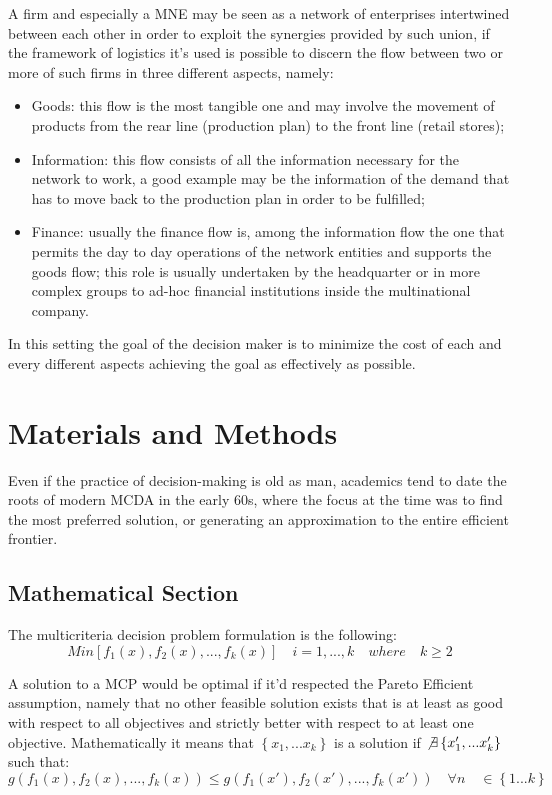 \documentclass[a0,portrait]{a0poster}
\begin{document}
\begin{multicols}{2}
A firm and especially a MNE may be seen as a network of enterprises intertwined between each other in order to exploit the synergies provided by such union, if the framework of logistics it's used is possible to discern the flow between two or more of such firms in three different aspects, namely:

\begin{itemize}
 \item Goods: this flow is the most tangible one and may involve the movement of products from the rear line (production plan) to the front line (retail stores);    
\item Information: this flow consists of all the information necessary for the network to work, a good example may be the information of the demand that has to move back to the production plan in order to be fulfilled;
\item Finance: usually the finance flow is, among the information flow the one that permits the day to day operations of the network entities and supports the goods flow; this role is usually undertaken by the headquarter or in more complex groups to ad-hoc financial institutions inside the multinational company. 
\end{itemize}
In this setting the goal of the decision maker is to minimize the cost of each and every different aspects achieving the goal as effectively as possible.

\section*{Materials and Methods}
Even if the practice of decision-making is old as man, academics tend to date the roots of modern MCDA in the early 60s, where the focus at the time was to find the most preferred solution, or generating an approximation to the entire efficient frontier\cite{Greco2016}.


\subsection*{Mathematical Section}

The multicriteria decision problem formulation is the following: 
$$
Min[f_1(x),f_2(x),...,f_k(x)] \quad i=1,...,k \quad where \quad k\geq2
$$
	

A solution to a MCP would be optimal if it'd respected the Pareto Efficient assumption, namely that no other feasible solution exists that is at least as good with respect to all objectives and strictly better with respect to at least one objective. Mathematically it means that $\left\{x_1,...x_k\right\}$ is a solution if $\not\exists \left\{x'_1,...x'_k\right\}$
such that:
	\[
	g(f_1(x),f_2(x),...,f_k(x)) \leq g(f_1(x'),f_2(x'),...,f_k(x')) \quad \forall n \quad \in  \left\{1...k\right\}
	\]


\end{multicols}
\end{document}
